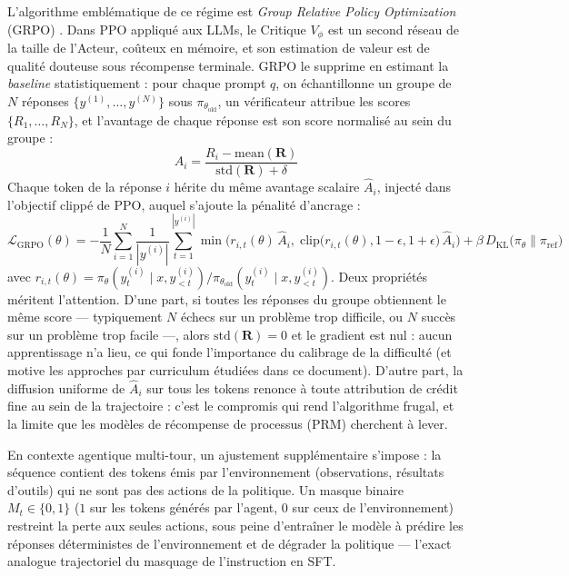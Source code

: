 \documentclass[11pt,a4paper]{article}
\begin{document}
L'algorithme emblématique de ce régime est \emph{Group Relative Policy Optimization} (GRPO) \cite{shao2024deepseekmath}. Dans PPO appliqué aux LLMs, le Critique $V_\phi$ est un second réseau de la taille de l'Acteur, coûteux en mémoire, et son estimation de valeur est de qualité douteuse sous récompense terminale. GRPO le supprime en estimant la \emph{baseline} statistiquement : pour chaque prompt $q$, on échantillonne un groupe de $N$ réponses $\{y^{(1)}, \dots, y^{(N)}\}$ sous $\pi_{\theta_{\text{old}}}$, un vérificateur attribue les scores $\{R_1, \dots, R_N\}$, et l'avantage de chaque réponse est son score normalisé au sein du groupe :
\begin{equation}
\hat{A}_i = \frac{R_i - \text{mean}(\mathbf{R})}{\text{std}(\mathbf{R}) + \delta}
\end{equation}
Chaque token de la réponse $i$ hérite du même avantage scalaire $\hat{A}_i$, injecté dans l'objectif clippé de PPO, auquel s'ajoute la pénalité d'ancrage :
\begin{equation}
\mathcal{L}_{\text{GRPO}}(\theta) = -\frac{1}{N} \sum_{i=1}^{N} \frac{1}{|y^{(i)}|} \sum_{t=1}^{|y^{(i)}|} \min\Big( r_{i,t}(\theta)\, \hat{A}_i, \; \text{clip}\big(r_{i,t}(\theta), 1-\epsilon, 1+\epsilon\big)\, \hat{A}_i \Big) + \beta \, D_{\text{KL}}\big( \pi_\theta \parallel \pi_{\text{ref}} \big)
\label{eq:grpo}
\end{equation}
avec $r_{i,t}(\theta) = \pi_\theta(y_t^{(i)} \mid x, y_{<t}^{(i)}) / \pi_{\theta_{\text{old}}}(y_t^{(i)} \mid x, y_{<t}^{(i)})$. Deux propriétés méritent l'attention. D'une part, si toutes les réponses du groupe obtiennent le même score — typiquement $N$ échecs sur un problème trop difficile, ou $N$ succès sur un problème trop facile —, alors $\text{std}(\mathbf{R}) = 0$ et le gradient est nul : aucun apprentissage n'a lieu, ce qui fonde l'importance du calibrage de la difficulté (et motive les approches par curriculum étudiées dans ce document). D'autre part, la diffusion uniforme de $\hat{A}_i$ sur tous les tokens renonce à toute attribution de crédit fine au sein de la trajectoire : c'est le compromis qui rend l'algorithme frugal, et la limite que les modèles de récompense de processus (PRM) cherchent à lever.

En contexte agentique multi-tour, un ajustement supplémentaire s'impose : la séquence contient des tokens émis par l'environnement (observations, résultats d'outils) qui ne sont pas des actions de la politique. Un masque binaire $M_t \in \{0,1\}$ ($1$ sur les tokens générés par l'agent, $0$ sur ceux de l'environnement) restreint la perte aux seules actions, sous peine d'entraîner le modèle à prédire les réponses déterministes de l'environnement et de dégrader la politique — l'exact analogue trajectoriel du masquage de l'instruction en SFT.
\end{document}
